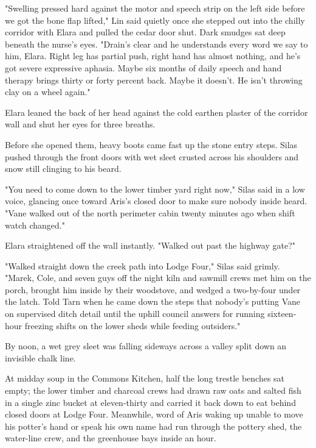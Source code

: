 "Swelling pressed hard against the motor and speech strip on the left side before we got the bone flap lifted," Lin said quietly once she stepped out into the chilly corridor with Elara and pulled the cedar door shut. Dark smudges sat deep beneath the nurse's eyes. "Drain's clear and he understands every word we say to him, Elara. Right leg has partial push, right hand has almost nothing, and he's got severe expressive aphasia. Maybe six months of daily speech and hand therapy brings thirty or forty percent back. Maybe it doesn't. He isn't throwing clay on a wheel again."

Elara leaned the back of her head against the cold earthen plaster of the corridor wall and shut her eyes for three breaths.

Before she opened them, heavy boots came fast up the stone entry steps. Silas pushed through the front doors with wet sleet crusted across his shoulders and snow still clinging to his beard.

"You need to come down to the lower timber yard right now," Silas said in a low voice, glancing once toward Aris's closed door to make sure nobody inside heard. "Vane walked out of the north perimeter cabin twenty minutes ago when shift watch changed."

Elara straightened off the wall instantly. "Walked out past the highway gate?"

"Walked straight down the creek path into Lodge Four," Silas said grimly. "Marek, Cole, and seven guys off the night kiln and sawmill crews met him on the porch, brought him inside by their woodstove, and wedged a two-by-four under the latch. Told Tarn when he came down the steps that nobody's putting Vane on supervised ditch detail until the uphill council answers for running sixteen-hour freezing shifts on the lower sheds while feeding outsiders."

\bigskip

By noon, a wet grey sleet was falling sideways across a valley split down an invisible chalk line.

At midday soup in the Commons Kitchen, half the long trestle benches sat empty; the lower timber and charcoal crews had drawn raw oats and salted fish in a single zinc bucket at eleven-thirty and carried it back down to eat behind closed doors at Lodge Four. Meanwhile, word of Aris waking up unable to move his potter's hand or speak his own name had run through the pottery shed, the water-line crew, and the greenhouse bays inside an hour.

